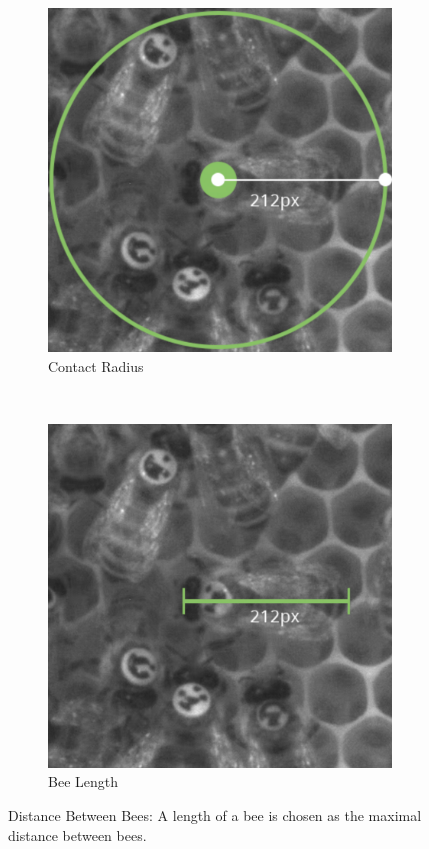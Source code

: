 \begin{figure}[b]
	\centering
	\begin{subfigure}[b]{0.45\textwidth}
		\centering
		\includegraphics[width=\textwidth]{Figures/radius}
		\caption[Contact Radius]{Contact Radius}
		\label{fig:radius}
	\end{subfigure}
	~ %
	\begin{subfigure}[b]{0.45\textwidth}
		\includegraphics[width=\textwidth]{Figures/sizeTagBee}
		\caption[Bee and Tag Size]{Bee Length}
		\label{fig:size}
	\end{subfigure}
	\caption{Distance Between Bees: A length of a bee is chosen as the maximal  distance between bees.}
	\label{fig:contactRadius}
\end{figure}

